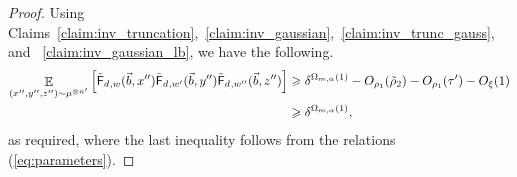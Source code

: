 \documentclass[10pt,a4paper]{amsart}
\newcommand\Expect[2]{{\mathop{\mathbb{E}}_{#1}\left[ {#2} \right]}}
\renewcommand\geq{\geqslant}
\newcommand{\V}[1]{{#1}}
\begin{document}
\begin{proof}
   
   
   Using Claims~\ref{claim:inv_truncation},~\ref{claim:inv_gaussian},~\ref{claim:inv_trunc_gauss}, and ~\ref{claim:inv_gaussian_lb}, we have the following.
   \begin{align*}
   \Expect{(\V x'', \V y'', \V z'')\sim\mu^{\otimes n'}}{\truncfcoarsedecoupled_{,\V w}(\vec{b}, \V x'')\truncfcoarsedecoupled_{,\V w'}(\vec{b}, \V y'') \truncfcoarsedecoupled_{,\V w''}(\vec{b}, \V z'')}&\geq \delta^{\Omega_{m,\alpha}(1)}- O_{\rho_1}(\tilde{\rho}_2) - O_{\rho_1}(\tau') -O_{\xi}(1)\\
   &\geq \delta^{\Omega_{m,\alpha}(1)},
   \end{align*}
   as required, where the last inequality follows from the relations (\ref{eq:parameters}).
\end{proof}
\end{document}
